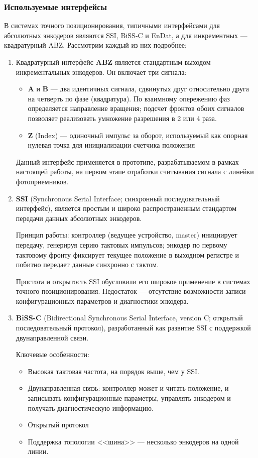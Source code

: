 \subsubsection{Используемые интерфейсы}

В системах точного позиционирования, типичными интерфейсами для абсолютных энкодеров являются SSI, BiSS‑C и EnDat, а для инкрементных — квадратурный ABZ. Рассмотрим каждый из них подробнее:

\begin{enumerate}
\item Квадратурный интерфейс \textbf{ABZ} является стандартным выходом инкрементальных энкодеров. Он включает три сигнала:
\begin{itemize}
\item \textbf{A} и \textbf{B} --- два идентичных сигнала, сдвинутых друг относительно друга на четверть по фазе (квадратура). По взаимному опережению фаз определяется направление вращения; подсчет фронтов обоих сигналов позволяет реализовать умножение разрешения в 2 или 4 раза.
\item \textbf{Z} (Index) --- одиночный импульс за оборот, используемый как опорная нулевая точка для инициализации счетчика положения
\end{itemize}

Данный интерфейс применяется в прототипе, разрабатываемом в рамках настоящей работы, на первом этапе отработки считывания сигнала с линейки фотоприемников.

\item \textbf{SSI} (Synchronous Serial Interface; синхронный последовательный интерфейс), является простым и широко распространенным стандартом передачи данных абсолютных энкодеров.

Принцип работы: контроллер (ведущее устройство, master) инициирует передачу, генерируя серию тактовых импульсов; энкодер по первому тактовому фронту фиксирует текущее положение в выходном регистре и побитно передает данные синхронно с тактом.

Простота и открытость SSI обусловили его широкое применение в системах точного позиционирования. Недостаток --- отсутствие возможности записи конфигурационных параметров и диагностики энкодера.

\item \textbf{BiSS-C} (Bidirectional Synchronous Serial Interface, version C; открытый последовательный протокол), разработанный как развитие SSI с поддержкой двунаправленной связи.

Ключевые особенности:
\begin{itemize}
\item Высокая тактовая частота, на порядок выше, чем у SSI.
\item Двунаправленная связь: контроллер может и читать положение, и записывать конфигурационные параметры, управлять энкодером и получать диагностическую информацию.
\item Открытый протокол
\item Поддержка топологии <<шина>> --- несколько энкодеров на одной линии.
\end{itemize}


\end{enumerate}
